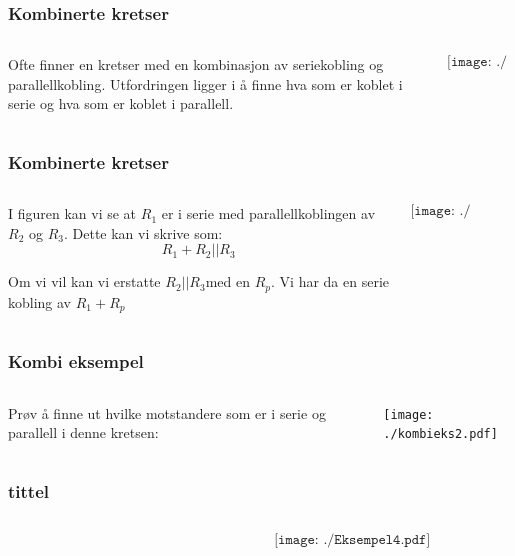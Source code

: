 \documentclass[aspectratio=169,xcolor=dvipsnames]{beamer}
\begin{document}
\begin{frame} \frametitle{Kombinerte kretser}
	\begin{columns}
		\begin{column}{0.5\textwidth}
			
Ofte finner en kretser med en kombinasjon av seriekobling og parallellkobling. Utfordringen ligger i å finne hva som er koblet i serie og hva som er koblet i parallell. 
		\end{column}
		\begin{column}{0.5\textwidth}
			$$\texttt{[image: ./kombieks1.pdf]}$$
		\end{column}
	\end{columns}
\end{frame}

\begin{frame} \frametitle{Kombinerte kretser}
	\begin{columns}
		\begin{column}{0.5\textwidth}
			

I figuren kan vi se at $R_{1}$
er i serie med parallellkoblingen av $R_{2}$ og $R_{3}$. Dette kan
vi skrive som:
\[
R_{1}+R_{2}||R_{3}
\]

Om vi vil kan vi erstatte $R_{2}||R_{3}$med en $R_{p}$. Vi har da
en serie kobling av $R_{1}+R_{p}$ 
		\end{column}
		\begin{column}{0.5\textwidth}
			$$\texttt{[image: ./kombieks1.pdf]}$$
		\end{column}
	\end{columns}
\end{frame}

\begin{frame} \frametitle{Kombi eksempel}
	\begin{columns}
		\begin{column}{0.5\textwidth}
Prøv å finne ut hvilke motstandere som er i serie og parallell i denne
kretsen:


		\end{column}
		\begin{column}{0.5\textwidth}
			\texttt{[image: ./kombieks2.pdf]}
		\end{column}
	\end{columns}
\end{frame}

\begin{frame} \frametitle{tittel}
	\begin{columns}
		\begin{column}{0.5\textwidth}
			
		\end{column}
		\begin{column}{0.5\textwidth}
			$$\texttt{[image: ./Eksempel4.pdf]}$$
		\end{column}
	\end{columns}
\end{frame}
\end{document}
